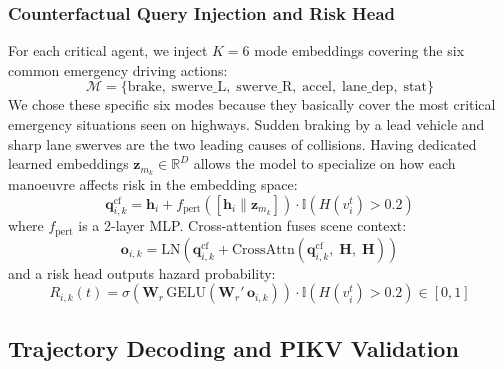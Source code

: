 \documentclass[preprint,12pt]{elsarticle}
\begin{document}
\subsubsection{Counterfactual Query Injection and Risk Head}
For each critical agent, we inject $K=6$ mode embeddings covering the six common emergency driving actions:
\begin{equation}
    \mathcal{M} = \{\text{brake}, \; \text{swerve\_L}, \; \text{swerve\_R}, \; \text{accel}, \; \text{lane\_dep}, \; \text{stat}\}
    \label{eq_modes}
\end{equation}
We chose these specific six modes because they basically cover the most critical emergency situations seen on highways. Sudden braking by a lead vehicle and sharp lane swerves are the two leading causes of collisions. Having dedicated learned embeddings $\mathbf{z}_{m_k} \in \mathbb{R}^D$ allows the model to specialize on how each manoeuvre affects risk in the embedding space:
\begin{equation}
    \mathbf{q}_{i,k}^{\text{cf}} = \mathbf{h}_i + f_{\text{pert}}\left(\left[\mathbf{h}_i \| \mathbf{z}_{m_k}\right]\right) \cdot \mathbb{I}\left(H(v_i^t) > 0.2\right)
    \label{eq_cf_query}
\end{equation}
where $f_{\text{pert}}$ is a 2-layer MLP. Cross-attention fuses scene context:
\begin{equation}
    \mathbf{o}_{i,k} = \text{LN}\left(\mathbf{q}_{i,k}^{\text{cf}} + \text{CrossAttn}\left(\mathbf{q}_{i,k}^{\text{cf}}, \; \mathbf{H}, \; \mathbf{H}\right)\right)
    \label{eq_cf_attn}
\end{equation}
and a risk head outputs hazard probability:
\begin{equation}
    R_{i,k}(t) = \sigma\left(\mathbf{W}_r \, \text{GELU}\left(\mathbf{W}_r' \, \mathbf{o}_{i,k}\right)\right) \cdot \mathbb{I}\left(H(v_i^t) > 0.2\right) \in [0, 1]
    \label{eq_risk_logit}
\end{equation}

\subsection{Trajectory Decoding and PIKV Validation}
\end{document}
